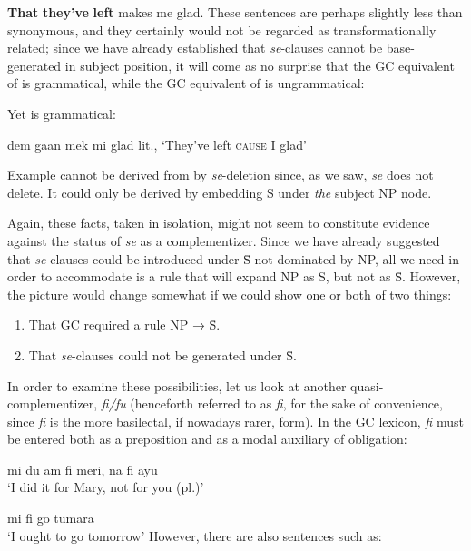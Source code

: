 \ea\label{ex:2:182}
\textbf{That} \textbf{they've} \textbf{left} makes me glad.
\z
These sentences are perhaps slightly less than synonymous, and they certainly would not be regarded as transformationally related; since we have already established that \textit{se}-clauses cannot be base-generated in subject position, it will come as no surprise that the GC equivalent of  is grammatical, while the GC equivalent of  is ungrammatical:

\z

\z

\noindent Yet  is grammatical:

\ea\label{ex:2:185}
 dem gaan mek mi glad
\glt  lit., `They've left \textsc{cause} I glad'
\z

Example  cannot be derived from  by \textit{se}-deletion since, as we saw, \textit{se} does not delete. It could only be derived by embedding S under \textit{the} subject NP node.

Again, these facts, taken in isolation, might not seem to con\-stitute evidence against the status of \textit{se} as a complementizer. Since we have already suggested that \textit{se}-clauses could be introduced under \=S not dominated by NP, all we need in order to accommodate  is a rule that will expand NP as S, but not as \=S. However, the picture would change somewhat if we could show one or both of two things:

\begin{enumerate}
\item That GC required a rule NP → \=S.
\item That \textit{se}-clauses could not be generated under \=S.
\end{enumerate}

In order to examine these possibilities, let us look at another quasi-
complementizer, \textit{fi/fu} (henceforth referred to as \textit{fi}, for the sake of convenience, since \textit{fi} is the more basilectal, if nowadays rarer, form). In the GC lexicon, \textit{fi} must be entered both as a preposition and as a modal auxiliary of obligation:

\ea\label{ex:2:186}
mi du am fi meri, na fi ayu\\
\glt `I did it for Mary, not for you (pl.)'
\z

\ea\label{ex:2:187}
mi fi go tumara\\
\glt `I ought to go tomorrow'
\z
However, there are also sentences such as:

